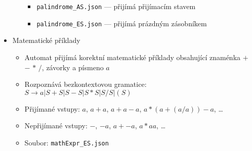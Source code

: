 \begin{itemize}
\begin{itemize}
            \begin{itemize}
                \item \texttt{palindrome\_AS.json} --- přijímá přijímacím stavem
                \item \texttt{palindrome\_ES.json} --- přijímá prázdným zásobníkem
            \end{itemize}
        \end{itemize}
    \item Matematické příklady
        \begin{itemize}
            \item Automat přijímá korektní matematické příklady obsahující znaménka $+$ $-$ $*$ $/$, závorky a písmeno $a$
            \item Rozpoznává bezkontextovou gramatice: $S \rightarrow a | S + S | S - S | S * S | S / S | ( S )$
            \item Přijímané vstupy: $a$, $a+a$, $a+a-a$, $a*(a+(a/a))-a$, \ldots
            \item Nepřijímané vstupy: $-$, $-a$, $a+-a$, $a*aa$, \ldots
            \item Soubor: \texttt{mathExpr\_ES.json}
        \end{itemize}
\end{itemize}

\endinput